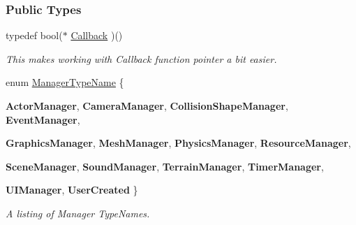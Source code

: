 \subsubsection*{Public Types}
\begin{DoxyCompactItemize}
\item 
\hypertarget{classphys_1_1ManagerBase_a753f5f0127131529767beab2502f480b}{
typedef bool($\ast$ \hyperlink{classphys_1_1ManagerBase_a753f5f0127131529767beab2502f480b}{Callback} )()}
\label{classphys_1_1ManagerBase_a753f5f0127131529767beab2502f480b}

\begin{DoxyCompactList}\small\item\em This makes working with Callback function pointer a bit easier. \item\end{DoxyCompactList}\item 
enum \hyperlink{classphys_1_1ManagerBase_aaa6ccddf23892eaccb898529414f80a5}{ManagerTypeName} \{ \par
{\bfseries ActorManager}, 
{\bfseries CameraManager}, 
{\bfseries CollisionShapeManager}, 
{\bfseries EventManager}, 
\par
{\bfseries GraphicsManager}, 
{\bfseries MeshManager}, 
{\bfseries PhysicsManager}, 
{\bfseries ResourceManager}, 
\par
{\bfseries SceneManager}, 
{\bfseries SoundManager}, 
{\bfseries TerrainManager}, 
{\bfseries TimerManager}, 
\par
{\bfseries UIManager}, 
{\bfseries UserCreated}
 \}
\begin{DoxyCompactList}\small\item\em A listing of Manager TypeNames. \item\end{DoxyCompactList}\end{DoxyCompactItemize}
